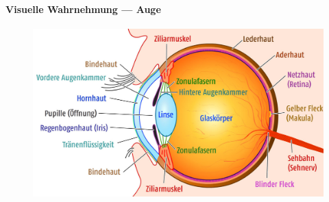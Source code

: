 \paragraph{Visuelle Wahrnehmung --- Auge}
\begin{figure}[H]
  \centering
  \includegraphics[width=.7\linewidth]{assets/img/auge.jpg}
\end{figure}

